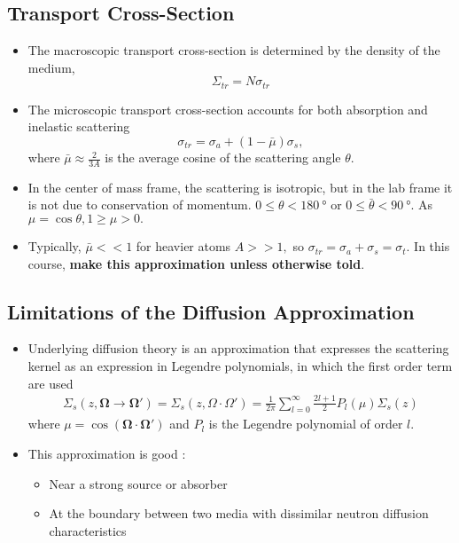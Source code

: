 \documentclass[a4paper]{article}
\begin{document}
\subsection{Transport Cross-Section}
\begin{itemize}
    \item The macroscopic transport cross-section is determined by the density of the medium, \begin{equation}
        \Sigma_{tr}=N\sigma_{tr}
    \end{equation}
    \item The microscopic transport cross-section accounts for both absorption and inelastic scattering \begin{equation}
        \sigma_{tr}=\sigma_a+(1-\bar\mu)\sigma_s,
    \end{equation}
    where $\bar\mu\approx\frac{2}{3A}$ is the average cosine of the scattering angle $\theta.$
    \item In the center of mass frame, the scattering is isotropic, but in the lab frame it is not due to conservation of momentum. $0\leq\theta<\SI{180}{\degree}$ or $0\leq\bar\theta<\SI{90}{\degree}.$ As $\mu=\cos\theta,1\geq\mu>0.$
    \item Typically, $\bar\mu<<1$ for heavier atoms $A>>1,$ so $\sigma_{tr}=\sigma_a+\sigma_s=\sigma_t.$ In this course, \textbf{make this approximation unless otherwise told}.
\end{itemize}
\subsection{Limitations of the Diffusion Approximation}
\begin{itemize}
    \item Underlying diffusion theory is an approximation that expresses the scattering kernel as an expression in Legendre polynomials, in which the first order term are used
    \begin{align}
        \Sigma_s(z,\mathbf\Omega\to\mathbf\Omega')=\Sigma_s(z,\Omega\cdot\Omega')=\frac{1}{2\pi}\sum_{l=0}^\infty\frac{2l+1}{2}P_l(\mu)\Sigma_s(z)
    \end{align}
    where $\mu=\cos(\mathbf\Omega\cdot\mathbf\Omega')$ and $P_l$ is the Legendre polynomial of order $l.$
    \item This approximation is good :\begin{itemize}
        \item Near a strong source or absorber
        \item At the boundary between two media with dissimilar neutron diffusion characteristics
    \end{itemize}
\end{itemize}
\end{document}
